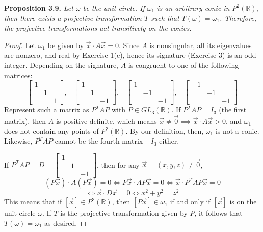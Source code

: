 \documentclass[leqno]{book}
\begin{document}
\noindent\textbf{Proposition 3.9.} \emph{Let $\omega$ be the unit circle.  If $\omega_1$ is an arbitrary conic in $P^2(\mathbb R)$, then there exists a projective transformation $T$ such that $T(\omega)=\omega_1$.  Therefore, the projective transformations act transitively on the conics.} %
\begin{proof}
Let $\omega_1$ be given by $\vec x\cdot A\vec x=0$.  Since $A$ is nonsingular, all its eigenvalues are nonzero, and real by Exercise 1(c), hence its signature (Exercise 3) is an odd integer.  Depending on the signature, $A$ is congruent to one of the following matrices:
$$\begin{bmatrix}1\\&1\\&&1\end{bmatrix},~~~~\begin{bmatrix}1\\&1\\&&-1\end{bmatrix},~~~~\begin{bmatrix}1\\&-1\\&&-1\end{bmatrix},~~~~\begin{bmatrix}-1\\&-1\\&&-1\end{bmatrix}$$
Represent such a matrix as $P^TAP$ with $P\in GL_3(\mathbb R)$.  If $P^TAP=I_3$ (the first matrix), then $A$ is positive definite, which means $\vec x\ne\vec 0\implies\vec x\cdot A\vec x>0$, and $\omega_1$ does not contain any points of $P^2(\mathbb R)$.  By our definition, then, $\omega_1$ is not a conic.  Likewise, $P^TAP$ cannot be the fourth matrix $-I_3$ either.

If $P^TAP=D=\begin{bmatrix}1\\&1\\&&-1\end{bmatrix}$, then for any $\vec x=(x,y,z)\ne\vec 0$,
$$(P\vec x)\cdot A(P\vec x)=0\iff P\vec x\cdot AP\vec x=0\iff \vec x\cdot P^TAP\vec x=0$$
$$\iff \vec x\cdot D\vec x=0\iff x^2+y^2=z^2$$
This means that if $[\vec x]\in P^2(\mathbb R)$, then $[P\vec x]\in\omega_1$ if and only if $[\vec x]$ is on the unit circle $\omega$.  If $T$ is the projective transformation given by $P$, it follows that $T(\omega)=\omega_1$ as desired.


\end{proof}
\end{document}
